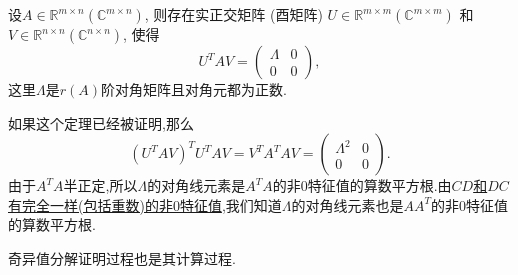 \documentclass[../../main.tex]{subfiles}
\begin{document}
\begin{theorem}\label{theorem:奇异值分解}
设\( A \in \mathbb{R}^{m \times n} (\mathbb{C}^{m \times n}) \), 则存在实正交矩阵 (酉矩阵) \( U \in \mathbb{R}^{m \times m} (\mathbb{C}^{m \times m}) \) 和 \( V \in \mathbb{R}^{n \times n} (\mathbb{C}^{n \times n}) \), 使得
\[
U^T A V = \begin{pmatrix}
\Lambda & 0 \\
0 & 0
\end{pmatrix},
\]
这里\( \Lambda \)是\( r(A) \)阶对角矩阵且对角元都为正数.
\end{theorem}
\begin{note}
如果这个定理已经被证明,那么
\[
(U^T A V)^T U^T A V = V^T A^T A V = \begin{pmatrix}
\Lambda^2 & 0 \\
0 & 0
\end{pmatrix}.
\]
由于\( A^T A \)半正定,所以\( \Lambda \)的对角线元素是\( A^T A \)的非0特征值的算数平方根.由\hyperref[theorem:AB和BA的非0特征值的Jordan块完全一致]{\( CD \)和\( DC \)有完全一样(包括重数)的非0特征值},我们知道\( \Lambda \)的对角线元素也是\( AA^T \)的非0特征值的算数平方根.
\end{note}
\begin{remark}
奇异值分解证明过程也是其计算过程.
\end{remark}
\end{document}
